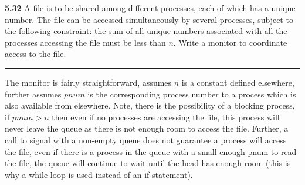 \documentclass[12pt]{jhwhw}
\begin{document}
\textbf{5.32}  
	A file is to be shared among different processes, each of which has a unique number.
	The file can be accessed simultaneously by several processes, subject to the following
	constraint: the sum of all unique numbers associated with all the processes accessing
	the file must be less than $n$. Write a monitor to coordinate access to the file.
\textcolor[RGB]{240,240,240}{\rule{\textwidth}{0.5pt}}\bigbreak

	\begin{addmargin}[1em]{}
		The monitor is fairly straightforward, assumes $n$ is a constant defined elsewhere,
		further assumes $pnum$ is the corresponding process number to a process which
		is also available from elsewhere. Note, there is the possibility of a blocking
		process, if $pnum > n$ then even if no processes are accessing the file, this process
		will never leave the queue as there is not enough room to access the file.
		Further, a call to signal with a non-empty queue does not guarantee a 
		process will access the file, even if there is a process in the queue with a small
		enough pnum to read the file, the queue will continue to wait until the head has
		enough room (this is why a while loop is used instead of an if statement).
		\inputminted{c}{5.32.c}
	\end{addmargin}
	\bigbreak
\end{document}
